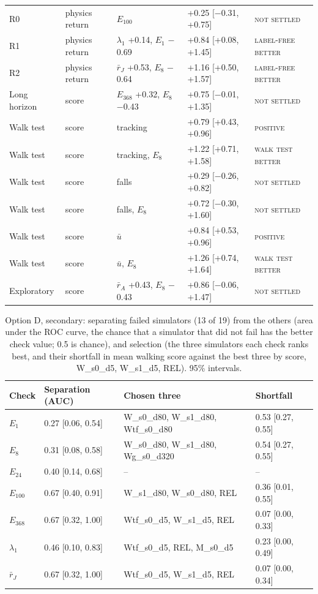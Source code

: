 \begin{table}[h]
\begin{tabular}{@{}lllll@{}}
R0 & physics return & $E_{100}$ & +0.25 [$-$0.31, +0.75] & \textsc{not settled} \\
R1 & physics return & $\lambda_1$ +0.14, $E_1$ $-$0.69 & +0.84 [+0.08, +1.45] & \textsc{label-free better} \\
R2 & physics return & $\bar r_J$ +0.53, $E_8$ $-$0.64 & +1.16 [+0.50, +1.57] & \textsc{label-free better} \\
Long horizon & score & $E_{368}$ +0.32, $E_8$ $-$0.43 & +0.75 [$-$0.01, +1.35] & \textsc{not settled} \\
Walk test & score & tracking & +0.79 [+0.43, +0.96] & \textsc{positive} \\
Walk test & score & tracking, $E_8$ & +1.22 [+0.71, +1.58] & \textsc{walk test better} \\
Walk test & score & falls & +0.29 [$-$0.26, +0.82] & \textsc{not settled} \\
Walk test & score & falls, $E_8$ & +0.72 [$-$0.30, +1.60] & \textsc{not settled} \\
Walk test & score & $\bar u$ & +0.84 [+0.53, +0.96] & \textsc{positive} \\
Walk test & score & $\bar u$, $E_8$ & +1.26 [+0.74, +1.64] & \textsc{walk test better} \\
Exploratory & score & $\bar r_A$ +0.43, $E_8$ $-$0.43 & +0.86 [$-$0.06, +1.47] & \textsc{not settled} \\
\bottomrule
\end{tabular}
\end{table}

\begin{table}[h]
\centering
\caption{Option D, secondary: separating failed simulators (13 of 19) from the others (area
under the ROC curve, the chance that a simulator that did not fail has the better check value; 0.5 is chance), and
selection (the three simulators each check ranks best, and their shortfall in mean walking score against the best
three by score, W\_s0\_d5, W\_s1\_d5, REL). 95\% intervals.}
\label{tab:app-dsel}
\footnotesize
\begin{tabular}{@{}llll@{}}
\toprule
Check & Separation (AUC) & Chosen three & Shortfall \\
\midrule
$E_1$ & 0.27 [0.06, 0.54] & W\_s0\_d80, W\_s1\_d80, Wtf\_s0\_d80 & 0.53 [0.27, 0.55] \\
$E_8$ & 0.31 [0.08, 0.58] & W\_s0\_d80, W\_s1\_d80, Wg\_s0\_d320 & 0.54 [0.27, 0.55] \\
$E_{24}$ & 0.40 [0.14, 0.68] & -- & -- \\
$E_{100}$ & 0.67 [0.40, 0.91] & W\_s1\_d80, W\_s0\_d80, REL & 0.36 [0.01, 0.55] \\
$E_{368}$ & 0.67 [0.32, 1.00] & Wtf\_s0\_d5, W\_s1\_d5, REL & 0.07 [0.00, 0.33] \\
$\lambda_1$ & 0.46 [0.10, 0.83] & Wtf\_s0\_d5, REL, M\_s0\_d5 & 0.23 [0.00, 0.49] \\
$\bar r_J$ & 0.67 [0.32, 1.00] & Wtf\_s0\_d5, W\_s1\_d5, REL & 0.07 [0.00, 0.34] \\
\bottomrule
\end{tabular}
\end{table}

